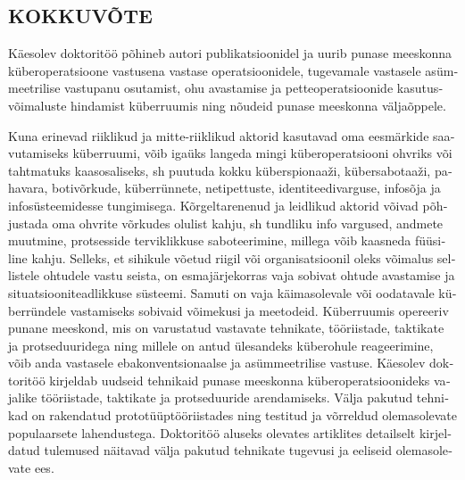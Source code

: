\begin{otherlanguage}{estonian}
\section*{KOKKUV\~{O}TE\\ \ThesisTitleEST }
Käesolev doktoritöö põhineb autori publikatsioonidel ja uurib punase meeskonna küberoperatsioone vastusena vastase operatsioonidele, tugevamale vastasele asümmeetrilise vastupanu osutamist, ohu avastamise ja petteoperatsioonide kasutusvõimaluste hindamist küberruumis ning nõudeid punase meeskonna väljaõppele.

Kuna erinevad riiklikud ja mitte-riiklikud aktorid kasutavad oma eesmärkide saavutamiseks küberruumi, võib igaüks langeda mingi küberoperatsiooni ohvriks või tahtmatuks kaasosaliseks, sh puutuda kokku küberspionaaži, kübersabotaaži, pahavara, botivõrkude, küberrünnete, netipettuste, identiteedivarguse, infosõja ja infosüsteemidesse tungimisega. Kõrgeltarenenud ja leidlikud aktorid võivad põhjustada oma ohvrite võrkudes olulist kahju, sh tundliku info vargused, andmete muutmine, protsesside terviklikkuse saboteerimine, millega võib kaasneda füüsiline kahju. Selleks, et sihikule võetud riigil või organisatsioonil oleks võimalus sellistele ohtudele vastu seista, on esmajärjekorras vaja sobivat ohtude avastamise ja situatsiooniteadlikkuse süsteemi. Samuti on vaja käimasolevale või oodatavale küberründele vastamiseks sobivaid võimekusi ja meetodeid. Küberruumis opereeriv punane meeskond, mis on varustatud vastavate tehnikate, tööriistade, taktikate ja protseduuridega ning millele on antud ülesandeks küberohule reageerimine, võib anda vastasele ebakonventsionaalse ja asümmeetrilise vastuse. Käesolev doktoritöö kirjeldab uudseid tehnikaid punase meeskonna küberoperatsioonideks vajalike tööriistade, taktikate ja protseduuride arendamiseks. Välja pakutud tehnikad on rakendatud prototüüptööriistades ning testitud ja võrreldud olemasolevate populaarsete lahendustega. Doktoritöö aluseks olevates artiklites detailselt kirjeldatud tulemused näitavad välja pakutud tehnikate tugevusi ja eeliseid olemasolevate ees.


\end{otherlanguage}
